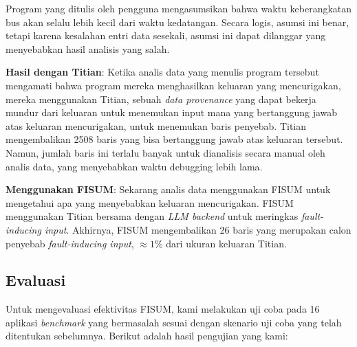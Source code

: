 Program yang ditulis oleh pengguna mengasumsikan bahwa 
waktu keberangkatan bus akan selalu lebih kecil dari 
waktu kedatangan. Secara logis, asumsi ini benar, 
tetapi karena kesalahan entri data sesekali, asumsi 
ini dapat dilanggar yang menyebabkan hasil analisis 
yang salah.

\textbf{Hasil dengan Titian}: Ketika analis data yang 
menulis program tersebut mengamati bahwa program mereka 
menghasilkan keluaran yang mencurigakan, mereka 
menggunakan Titian, sebuah \emph{data provenance} 
yang dapat bekerja mundur dari keluaran untuk menemukan 
input mana yang bertanggung jawab atas keluaran 
mencurigakan, untuk menemukan baris penyebab. 
Titian mengembalikan 2508 baris yang bisa bertanggung 
jawab atas keluaran tersebut. Namun, jumlah baris ini 
terlalu banyak untuk dianalisis secara manual oleh 
analis data, yang menyebabkan waktu debugging lebih lama.

\textbf{Menggunakan FISUM}: Sekarang analis data 
menggunakan FISUM untuk mengetahui apa yang menyebabkan 
keluaran mencurigakan. FISUM menggunakan Titian bersama 
dengan \emph{LLM backend} untuk meringkas 
\emph{fault-inducing input}. Akhirnya, FISUM mengembalikan 
26 baris yang merupakan calon penyebab 
\emph{fault-inducing input}, $\approx 1\%$ dari ukuran 
keluaran Titian.

\subsection{Evaluasi}
\label{subsec:evaluasi}

Untuk mengevaluasi efektivitas FISUM, kami melakukan uji
coba pada 16 aplikasi \emph{benchmark} yang bermasalah
sesuai dengan skenario uji coba yang telah ditentukan
sebelumnya. Berikut adalah hasil pengujian yang kami:

